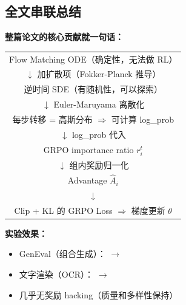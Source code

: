 \subsection{全文串联总结}

\begin{summarybox}
\textbf{整篇论文的核心贡献就一句话：}\\

\vspace{0.5em}
\begin{center}
\begin{tabular}{c}
Flow Matching ODE（确定性，无法做 RL）\\
$\downarrow$ 加扩散项（Fokker-Planck 推导）\\
逆时间 SDE（有随机性，可以探索）\\
$\downarrow$ Euler-Maruyama 离散化\\
每步转移 = 高斯分布 $\Rightarrow$ 可计算 log\_prob\\
$\downarrow$ log\_prob 代入\\
GRPO importance ratio $r_i^t$\\
$\downarrow$ 组内奖励归一化\\
Advantage $\hat{A}_i$\\
$\downarrow$\\
Clip + KL 的 GRPO Loss $\Rightarrow$ 梯度更新 $\theta$\\
\end{tabular}
\end{center}
\end{summarybox}

\textbf{实验效果：}
\begin{itemize}[leftmargin=1.5em]
  \item GenEval（组合生成）： $\to$ 
  \item 文字渲染（OCR）： $\to$ 
  \item 几乎无奖励 hacking（质量和多样性保持）
\end{itemize}

